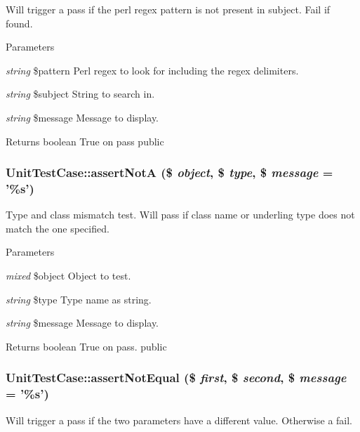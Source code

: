 Will trigger a pass if the perl regex pattern is not present in subject. Fail if found. 
\begin{DoxyParams}{Parameters}
\item[{\em string}]\$pattern Perl regex to look for including the regex delimiters. \item[{\em string}]\$subject String to search in. \item[{\em string}]\$message Message to display. \end{DoxyParams}
\begin{DoxyReturn}{Returns}
boolean True on pass  public 
\end{DoxyReturn}
\hypertarget{class_unit_test_case_ade7bbd612cc583ba67dd251064e4fa20}{
\subsubsection[{assertNotA}]{\setlength{\rightskip}{0pt plus 5cm}UnitTestCase::assertNotA (\$ {\em object}, \/  \$ {\em type}, \/  \$ {\em message} = {\ttfamily '\%s'})}}
\label{class_unit_test_case_ade7bbd612cc583ba67dd251064e4fa20}
Type and class mismatch test. Will pass if class name or underling type does not match the one specified. 
\begin{DoxyParams}{Parameters}
\item[{\em mixed}]\$object Object to test. \item[{\em string}]\$type Type name as string. \item[{\em string}]\$message Message to display. \end{DoxyParams}
\begin{DoxyReturn}{Returns}
boolean True on pass.  public 
\end{DoxyReturn}
\hypertarget{class_unit_test_case_a9b932083f42caa678fed9572b9cf6468}{
\subsubsection[{assertNotEqual}]{\setlength{\rightskip}{0pt plus 5cm}UnitTestCase::assertNotEqual (\$ {\em first}, \/  \$ {\em second}, \/  \$ {\em message} = {\ttfamily '\%s'})}}
\label{class_unit_test_case_a9b932083f42caa678fed9572b9cf6468}
Will trigger a pass if the two parameters have a different value. Otherwise a fail. 
